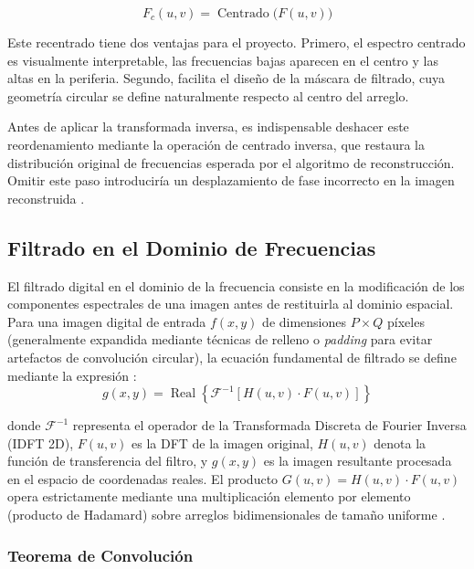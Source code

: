 \documentclass[conference]{IEEEtran}
\begin{document}
\begin{equation}
    F_c(u, v) = \operatorname{Centrado}\bigl(F(u,v)\bigr)
    \label{eq:fftshift}
\end{equation}

Este recentrado tiene dos ventajas para el proyecto. Primero, el
espectro centrado es visualmente interpretable, las frecuencias bajas aparecen en el centro y las altas en la periferia. Segundo, facilita el diseño de la máscara de filtrado, cuya geometría circular se define naturalmente respecto al centro del arreglo.

Antes de aplicar la transformada inversa, es indispensable deshacer este reordenamiento mediante la operación de centrado inversa, que restaura la distribución original de frecuencias esperada por el algoritmo de reconstrucción. Omitir este paso introduciría un desplazamiento de fase incorrecto en la imagen reconstruida \cite{numpyfft}.

\subsection{Filtrado en el Dominio de Frecuencias}

El filtrado digital en el dominio de la frecuencia consiste en la modificación de los componentes espectrales de una imagen antes de restituirla al dominio espacial. Para una imagen digital de entrada $f(x,y)$ de dimensiones $P \times Q$ píxeles (generalmente expandida mediante técnicas de relleno o \textit{padding} para evitar artefactos de convolución circular), la ecuación fundamental de filtrado se define mediante la expresión \cite{gonzalez2018}:
\begin{equation}
g(x,y) = \operatorname{Real}\left\{ \mathcal{F}^{-1} [H(u,v) \cdot F(u,v)] \right\}
\end{equation}

donde $\mathcal{F}^{-1}$ representa el operador de la Transformada Discreta de Fourier Inversa (IDFT 2D), $F(u,v)$ es la DFT de la imagen original, $H(u,v)$ denota la función de transferencia del filtro, y $g(x,y)$ es la imagen resultante procesada en el espacio de coordenadas reales. El producto $G(u,v) = H(u,v) \cdot F(u,v)$ opera estrictamente mediante una multiplicación elemento por elemento (producto de Hadamard) sobre arreglos bidimensionales de tamaño uniforme \cite{gonzalez2018}.

\subsubsection{Teorema de Convolución}
\end{document}
